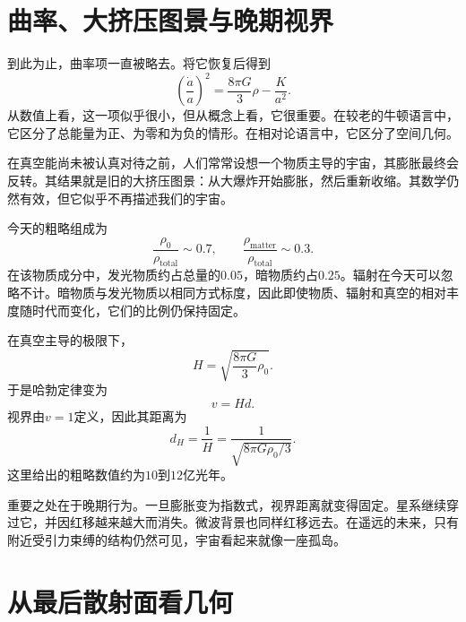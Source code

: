 \section{曲率、大挤压图景与晚期视界}

到此为止，曲率项一直被略去。将它恢复后得到
\begin{equation}
\left(\frac{\dot a}{a}\right)^2
=
\frac{8\pi G}{3}\rho
-
\frac{K}{a^2}.
\end{equation}
从数值上看，这一项似乎很小，但从概念上看，它很重要。在较老的牛顿语言中，它区分了总能量为正、为零和为负的情形。在相对论语言中，它区分了空间几何。

在真空能尚未被认真对待之前，人们常常设想一个物质主导的宇宙，其膨胀最终会反转。其结果就是旧的大挤压图景：从大爆炸开始膨胀，然后重新收缩。其数学仍然有效，但它似乎不再描述我们的宇宙。

\begin{classroomqa}
\end{classroomqa}

今天的粗略组成为
\begin{equation}
\frac{\rho_0}{\rho_{\text{total}}}\sim 0.7,
\qquad
\frac{\rho_{\text{matter}}}{\rho_{\text{total}}}\sim 0.3.
\end{equation}
在该物质成分中，发光物质约占总量的\(0.05\)，暗物质约占\(0.25\)。辐射在今天可以忽略不计。暗物质与发光物质以相同方式标度，因此即使物质、辐射和真空的相对丰度随时代而变化，它们的比例仍保持固定。

在真空主导的极限下，
\begin{equation}
H=\sqrt{\frac{8\pi G}{3}\rho_0}.
\end{equation}
于是哈勃定律变为
\begin{equation}
v=Hd.
\end{equation}
视界由\(v=1\)定义，因此其距离为
\begin{equation}
d_H=\frac{1}{H}
=
\frac{1}{\sqrt{8\pi G\rho_0/3}}.
\end{equation}
这里给出的粗略数值约为\(10\)到\(12\)亿光年。

重要之处在于晚期行为。一旦膨胀变为指数式，视界距离就变得固定。星系继续穿过它，并因红移越来越大而消失。微波背景也同样红移远去。在遥远的未来，只有附近受引力束缚的结构仍然可见，宇宙看起来就像一座孤岛。

\section{从最后散射面看几何}

